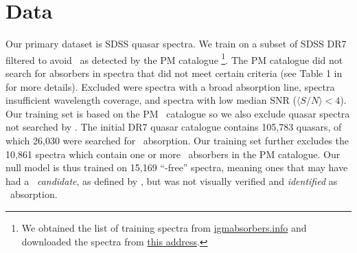 \documentclass[fleqn,usenatbib]{mnras}
\newcommand{\civ}{\ion{C}{IV}}
\newcommand{\zqso}{z_{\textrm{QSO}}}
\begin{document}


\section{Data}
\label{sec:data}

Our primary dataset is SDSS quasar spectra. We train on a subset of SDSS DR7 \citep{sdssdr7} filtered to avoid \civ\ as detected by the PM catalogue \citep{C13}\footnote{We obtained
the list of training spectra from \url{igmabsorbers.info} %
 and downloaded the spectra from \href{http://das.sdss.org/spectro/1d_26}{this address}.}.
The PM catalogue did not search for absorbers in spectra that did not meet certain criteria  (see Table 1 in \citeauthor{C13} %
for more details). Excluded were spectra with a broad absorption line, %
spectra insufficient wavelength coverage, %
and
spectra with low median SNR ($\langle S/N\rangle<4$).
Our training set is based on the PM \civ\ catalogue so we also exclude quasar spectra not searched by \cite{C13}. The initial DR7 quasar
catalogue contains 105,783 quasars, of which 26,030 were
searched for \civ\ absorption. Our training set further
excludes the 10,861 spectra which contain one or more \civ\ absorbers
in the PM catalogue.
Our null model is thus trained on 15,169 ``\civ-free'' spectra, meaning ones that may have had a \civ\ \textit{candidate}, as defined by \cite{C13}, but was not visually verified and \textit{identified} as \civ\ absorption.
\end{document}
